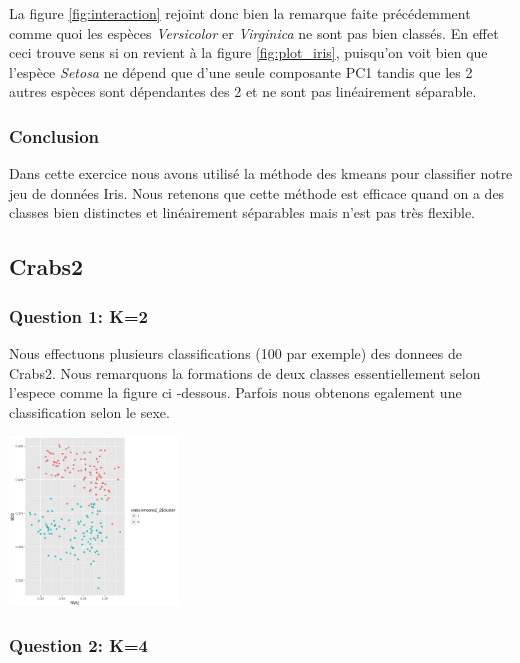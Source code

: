 \documentclass[10pt]{article}
\begin{document}
La figure \ref{fig:interaction} rejoint donc bien la remarque faite précédemment comme quoi les espèces \textit{Versicolor} er \textit{Virginica} ne sont pas bien classés. En effet ceci trouve sens si on revient à la figure \ref{fig:plot_iris}, puisqu'on voit bien que l'espèce \textit{Setosa} ne dépend que d'une seule composante PC1 tandis que les 2 autres espèces sont dépendantes des 2 et ne sont pas linéairement séparable.
\subsubsection{Conclusion}
Dans cette exercice nous avons utilisé la méthode des kmeans pour classifier notre jeu de données Iris. Nous retenons que cette méthode est efficace quand on a des classes bien distinctes et linéairement séparables mais n'est pas très flexible.

\subsection{Crabs2}

\subsubsection{Question 1: K=2}

Nous effectuons plusieurs classifications (100 par exemple) des donnees de Crabs2. Nous remarquons la formations de deux classes essentiellement selon l'espece comme la figure ci -dessous. Parfois nous obtenons egalement une classification selon le sexe.
\begin{center}
	\includegraphics[width=45mm]{Figures/Crabs2_2/kmeans2_1.png}
	\label{fig:crabs2_kmeans2}
\end{center}
\hspace{0.02\linewidth}

\subsubsection{Question 2: K=4}
\end{document}
